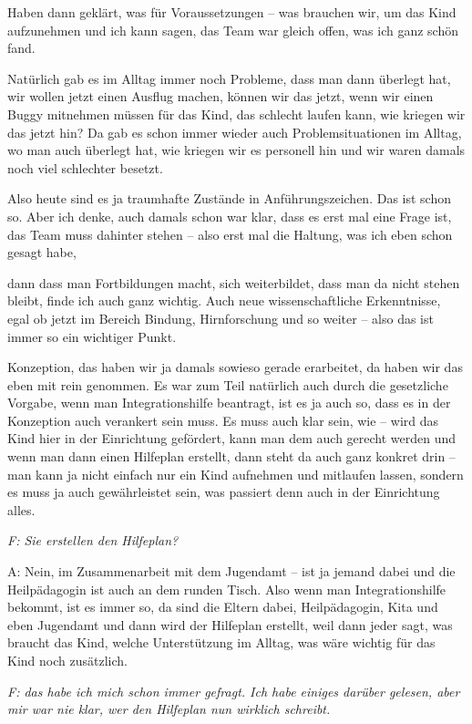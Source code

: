 \begin{linenumbers*}
Haben dann geklärt, was für Voraussetzungen -- was brauchen wir, um das Kind aufzunehmen und ich kann sagen, das Team war gleich offen, was ich ganz schön fand. 

Natürlich gab es im Alltag immer noch Probleme, dass man dann überlegt hat, wir wollen jetzt einen Ausflug machen, können wir das jetzt, wenn wir einen Buggy mitnehmen müssen für das Kind, das schlecht laufen kann, wie kriegen wir das jetzt hin? Da gab es schon immer wieder auch Problemsituationen im Alltag, wo man auch überlegt hat, wie kriegen wir es personell hin und wir waren damals noch viel schlechter besetzt. 

Also heute sind es ja traumhafte Zustände in Anführungszeichen. Das ist schon so. Aber ich denke, auch damals schon war klar, dass es erst mal eine Frage ist, das Team muss dahinter stehen -- also erst mal die Haltung, was ich eben schon gesagt habe, 

dann dass man Fortbildungen macht, sich weiterbildet, dass man da nicht stehen bleibt, finde ich auch ganz wichtig. Auch neue wissenschaftliche Erkenntnisse, egal ob jetzt im Bereich Bindung, Hirnforschung und so weiter -- also das ist immer so ein wichtiger Punkt. 

Konzeption, das haben wir ja damals sowieso gerade erarbeitet, da haben wir das eben mit rein genommen. Es war zum Teil natürlich auch durch die gesetzliche Vorgabe, wenn man Integrationshilfe beantragt, ist es ja auch so, dass es in der Konzeption auch verankert sein muss. Es muss auch klar sein, wie -- wird das Kind hier in der Einrichtung gefördert, kann man dem auch gerecht werden und wenn man dann einen Hilfeplan erstellt, dann steht da auch ganz konkret drin --  man kann ja nicht einfach nur ein Kind aufnehmen und mitlaufen lassen, sondern es muss ja auch gewährleistet sein, was passiert denn auch in der Einrichtung alles. 

\emph{F: Sie erstellen den Hilfeplan?} 

A: Nein, im Zusammenarbeit mit dem Jugendamt -- ist ja jemand dabei und die Heilpädagogin ist auch an dem runden Tisch. Also wenn man Integrationshilfe bekommt, ist es immer so, da sind die Eltern dabei, Heilpädagogin, Kita und eben Jugendamt und dann wird der Hilfeplan erstellt, weil dann jeder sagt, was braucht das Kind, welche Unterstützung im Alltag, was wäre wichtig für das Kind noch zusätzlich. 

\emph{F: das habe ich mich schon immer gefragt. Ich habe einiges darüber gelesen, aber mir war nie klar, wer den Hilfeplan nun wirklich schreibt.}


\end{linenumbers*}
